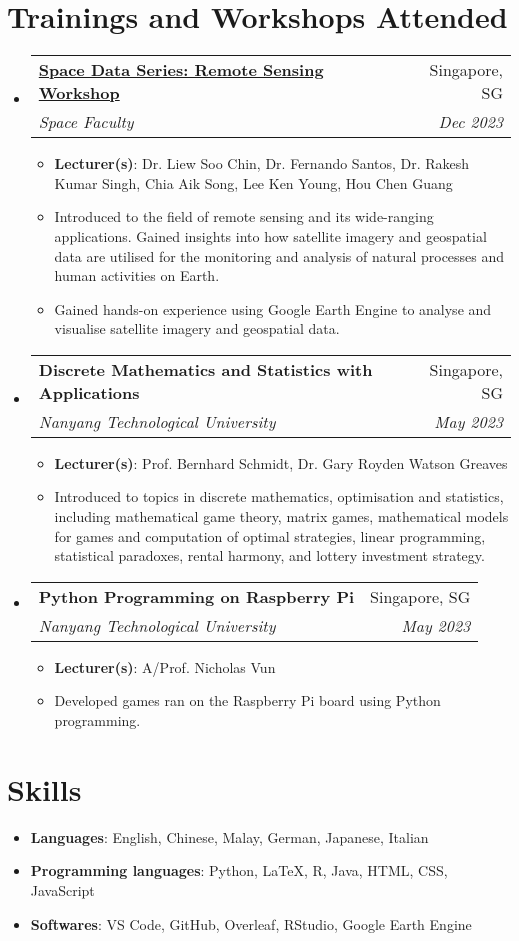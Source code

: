 \documentclass[a4paper,11pt]{article}
\makeatletter
\newcommand{\resumeItem}[2]{
    \item\small{
        \textbf{#1}{: #2 \vspace{-2pt}}
    }
}
\newcommand{\resumeItemPaper}[1]{
    \item\small{
            {#1}
    }
}
\newcommand{\resumeSubheading}[4]{
    \vspace{-1pt}\item
    \begin{tabular*}{0.97\textwidth}{l@{\extracolsep{\fill}}r}
        \textbf{#1}       & #2                 \\
        \textit{\small#3} & \textit{\small #4} \\
    \end{tabular*}\vspace{-5pt}
}
\newcommand{\resumeSubHeadingListStart}{\begin{itemize}[leftmargin=*]}
\newcommand{\resumeSubHeadingListEnd}{\end{itemize}}
\newcommand{\resumeItemListStart}{\begin{itemize}}
\newcommand{\resumeItemListEnd}{\end{itemize}\vspace{-5pt}}
\makeatother
\begin{document}
\section{Trainings and Workshops Attended}
\resumeSubHeadingListStart
\resumeSubheading
{\href{https://github.com/Ryanjoo18/remote-data-sensing-workshop-2023}{Space Data Series: Remote Sensing Workshop}}{Singapore, SG}
{Space Faculty}{Dec 2023}
\resumeItemListStart
\resumeItem{Lecturer(s)}{Dr. Liew Soo Chin, Dr. Fernando Santos, Dr. Rakesh Kumar Singh, Chia Aik Song, Lee Ken Young, Hou Chen Guang}
\resumeItemPaper{Introduced to the field of remote sensing and its wide-ranging applications. Gained insights into how satellite imagery and geospatial data are utilised for the monitoring and analysis of natural processes and human activities on Earth.}
\resumeItemPaper{Gained hands-on experience using Google Earth Engine to analyse and visualise satellite imagery and geospatial data.}
\resumeItemListEnd

\resumeSubheading
{Discrete Mathematics and Statistics with Applications}{Singapore, SG}
{Nanyang Technological University}{May 2023}
\resumeItemListStart
\resumeItem{Lecturer(s)}{Prof. Bernhard Schmidt, Dr. Gary Royden Watson Greaves}
\resumeItemPaper{Introduced to topics in discrete mathematics, optimisation and statistics, including mathematical game theory, matrix games, mathematical models for games and computation of optimal strategies, linear programming, statistical paradoxes, rental harmony, and lottery investment strategy.}
\resumeItemListEnd

\resumeSubheading
{Python Programming on Raspberry Pi}{Singapore, SG}
{Nanyang Technological University}{May 2023}
\resumeItemListStart
\resumeItem{Lecturer(s)}{A/Prof. Nicholas Vun}
\resumeItemPaper{Developed games ran on the Raspberry Pi board using Python programming.}
\resumeItemListEnd
\resumeSubHeadingListEnd

\section{Skills}
\resumeSubHeadingListStart
\item{\textbf{Languages}{: English, Chinese, Malay, German, Japanese, Italian}}
\item{\textbf{Programming languages}{: Python, \LaTeX, R, Java, HTML, CSS, JavaScript}}
\item{\textbf{Softwares}{: VS Code, GitHub, Overleaf, RStudio, Google Earth Engine}}
\resumeSubHeadingListEnd
\end{document}
